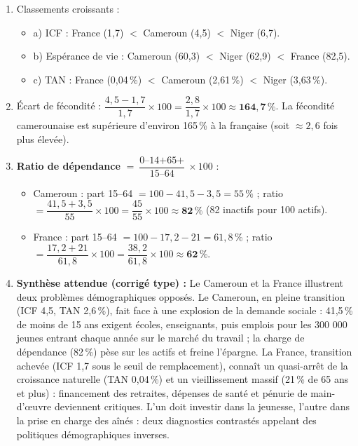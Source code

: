 \documentclass[11pt]{article}
\begin{document}
\begin{corrige}
\begin{enumerate}
    \item Classements croissants :
    \begin{itemize}
        \item a) ICF : France (1,7) $<$ Cameroun (4,5) $<$ Niger (6,7).
        \item b) Espérance de vie : Cameroun (60,3) $<$ Niger (62,9) $<$ France (82,5).
        \item c) TAN : France (0,04\,\%) $<$ Cameroun (2,61\,\%) $<$ Niger (3,63\,\%).
    \end{itemize}
    \item Écart de fécondité : $\dfrac{4,5 - 1,7}{1,7} \times 100 = \dfrac{2,8}{1,7}\times 100 \approx \mathbf{164,7\,\%}$. La fécondité camerounaise est supérieure d'environ 165\,\% à la française (soit $\approx 2,6$ fois plus élevée).
    \item \textbf{Ratio de dépendance} $= \dfrac{\text{0--14} + \text{65+}}{\text{15--64}} \times 100$ :
    \begin{itemize}
        \item Cameroun : part 15--64 $= 100 - 41,5 - 3,5 = 55\,\%$ ; ratio $= \dfrac{41,5+3,5}{55}\times 100 = \dfrac{45}{55}\times 100 \approx \mathbf{82\,\%}$ (82 inactifs pour 100 actifs).
        \item France : part 15--64 $= 100 - 17,2 - 21 = 61,8\,\%$ ; ratio $= \dfrac{17,2+21}{61,8}\times 100 = \dfrac{38,2}{61,8}\times 100 \approx \mathbf{62\,\%}$.
    \end{itemize}
    \item \textbf{Synthèse attendue (corrigé type) :} Le Cameroun et la France illustrent deux problèmes démographiques opposés. Le Cameroun, en pleine transition (ICF 4,5, TAN 2,6\,\%), fait face à une explosion de la demande sociale : 41,5\,\% de moins de 15 ans exigent écoles, enseignants, puis emplois pour les 300 000 jeunes entrant chaque année sur le marché du travail ; la charge de dépendance (82\,\%) pèse sur les actifs et freine l'épargne. La France, transition achevée (ICF 1,7 sous le seuil de remplacement), connaît un quasi-arrêt de la croissance naturelle (TAN 0,04\,\%) et un vieillissement massif (21\,\% de 65 ans et plus) : financement des retraites, dépenses de santé et pénurie de main-d'œuvre deviennent critiques. L'un doit investir dans la jeunesse, l'autre dans la prise en charge des aînés : deux diagnostics contrastés appelant des politiques démographiques inverses.
\end{enumerate}
\end{corrige}
\end{document}
